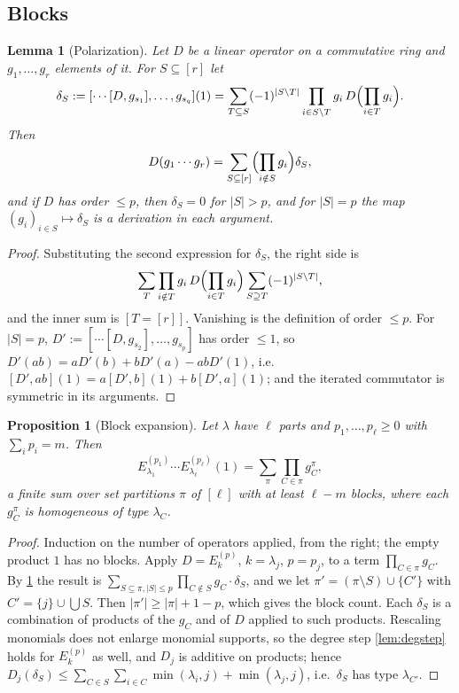 \documentclass[11pt]{amsart}
\newtheorem{proposition}[theorem]{Proposition}
\newtheorem{lemma}[theorem]{Lemma}
\theoremstyle{definition}
\theoremstyle{remark}
\numberwithin{equation}{section}
\begin{document}
\subsection{Blocks}
\begin{lemma}[Polarization]\label{lem:polar}
Let $D$ be a linear operator on a commutative ring and $g_1,\dots,g_r$ elements of it. For $S\subseteq[r]$ let
\[ \delta_S:=[\cdots[D,g_{s_1}],\dots,g_{s_q}](1)=\sum_{T\subseteq S}(-1)^{|S\setminus T|}\prod_{i\in S\setminus T}g_i\,D\Bigl(\prod_{i\in T}g_i\Bigr). \]
Then
\[ D(g_1\cdots g_r)=\sum_{S\subseteq[r]}\Bigl(\prod_{i\notin S}g_i\Bigr)\delta_S , \]
and if $D$ has order $\le p$, then $\delta_S=0$ for $|S|>p$, and for $|S|=p$ the map $(g_i)_{i\in S}\mapsto\delta_S$ is a derivation in each argument.
\end{lemma}
\begin{proof}
Substituting the second expression for $\delta_S$, the right side is
\[ \sum_T\prod_{i\notin T}g_i\,D\Bigl(\prod_{i\in T}g_i\Bigr)\sum_{S\supseteq T}(-1)^{|S\setminus T|}, \]
and the inner sum is $[T=[r]]$. Vanishing is the definition of order $\le p$. For $|S|=p$, $D':=[\cdots[D,g_{s_2}],\dots,g_{s_p}]$ has order $\le1$, so $D'(ab)=aD'(b)+bD'(a)-abD'(1)$, i.e.\ $[D',ab](1)=a[D',b](1)+b[D',a](1)$; and the iterated commutator is symmetric in its arguments.
\end{proof}

\begin{proposition}[Block expansion]\label{prop:block}
Let $\lambda$ have $\ell$ parts and $p_1,\dots,p_\ell\ge0$ with $\sum_ip_i=m$. Then
\[ E^{(p_1)}_{\lambda_1}\cdots E^{(p_\ell)}_{\lambda_\ell}(1)=\sum_\pi\prod_{C\in\pi}g^\pi_C , \]
a finite sum over set partitions $\pi$ of $[\ell]$ with at least $\ell-m$ blocks, where each $g^\pi_C$ is homogeneous of type $\lambda_C$.
\end{proposition}
\begin{proof}
Induction on the number of operators applied, from the right; the empty product $1$ has no blocks. Apply $D=E^{(p)}_k$, $k=\lambda_j$, $p=p_j$, to a term $\prod_{C\in\pi}g_C$. By \cref{lem:polar} the result is $\sum_{S\subseteq\pi,|S|\le p}\prod_{C\notin S}g_C\cdot\delta_S$, and we let $\pi'=(\pi\setminus S)\cup\{C'\}$ with $C'=\{j\}\cup\bigcup S$. Then $|\pi'|\ge|\pi|+1-p$, which gives the block count. Each $\delta_S$ is a combination of products of the $g_C$ and of $D$ applied to such products. Rescaling monomials does not enlarge monomial supports, so the degree step \cref{lem:degstep} holds for $E^{(p)}_k$ as well, and $D_j$ is additive on products; hence $D_j(\delta_S)\le\sum_{C\in S}\sum_{i\in C}\min(\lambda_i,j)+\min(\lambda_j,j)$, i.e.\ $\delta_S$ has type $\lambda_{C'}$.
\end{proof}
\end{document}
